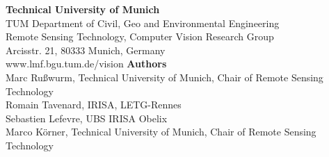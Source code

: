 \documentclass[a0]{tumposter}
\begin{document}
\vfill

\begin{footer}
	\begin{multicols}{2}
		\textbf{Technical University of Munich}\\
		TUM Department of Civil, Geo and Environmental Engineering \\
		Remote Sensing Technology, Computer Vision Research Group \\
		Arcisstr. 21, 80333 Munich, Germany \\
		www.lmf.bgu.tum.de/vision
	\vfill\columnbreak
		\textbf{Authors} \\
		Marc Rußwurm, Technical University of Munich, Chair of Remote Sensing Technology \\
		Romain Tavenard, IRISA, LETG-Rennes \\
		Sebastien Lefevre, UBS IRISA Obelix  \\
		Marco Körner, Technical University of Munich, Chair of Remote Sensing Technology
	\vfill
	\end{multicols}
\end{footer}
\end{document}
